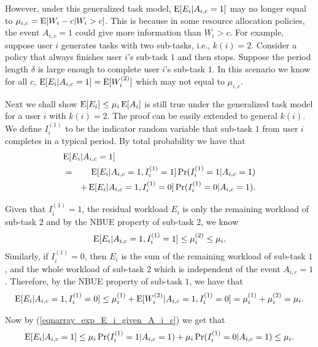 \documentclass[prodmode,acmtompecs]{acmsmall}
\begin{document}
However, under this generalized task model, $\operatorname*{\mathrm{E}}[E_i|A_{i,c} = 1]$ may no longer equal to $\mu_{i,c} = \operatorname*{\mathrm{E}}[W_i - c|W_i > c]$. This is because in some resource allocation policies, the event $A_{i, c} = 1$ could give more information than $W_i > c$. For example, suppose user $i$ generates tasks with two sub-tasks, i.e., $k(i) = 2$. Consider a policy that always finishes user $i$'s sub-task $1$ and then stops. Suppose the period length $\delta$ is large enough to complete user $i$'s sub-task $1$. In this scenario we know for all $c$, $\operatorname*{\mathrm{E}}[E_i | A_{i, c} = 1] = \operatorname*{\mathrm{E}}[W_i^{(2)}]$ which may not equal to $\mu_{i,c}$. 

Next we shall show $\operatorname*{\mathrm{E}}[E_i] \leq \mu_i \operatorname*{\mathrm{E}}[A_i]$ is still true under the generalized task model for a user $i$ with $k(i)=2$. The proof can be easily extended to general $k(i)$. We define $I_i^{(1)}$ to be the indicator random variable that sub-task $1$ from user $i$ completes in a typical period. By total probability we have that
\begin{eqnarray}
\label{eqnarray_exp_E_i_given_A_i_c}
\lefteqn{\expectation[E_i | A_{i, c} = 1]}	\\
& = & \expectation[E_i | A_{i, c} = 1, I_i^{(1)} = 1] \Pr(I_i^{(1)} = 1 | A_{i,c} = 1)	 \notag \\
&  & + \expectation[E_i | A_{i, c} = 1, I_i^{(1)} = 0] \Pr(I_i^{(1)} = 0 | A_{i,c} = 1).	\notag 
\end{eqnarray}

Given that $I_i^{(1)} = 1$, the residual workload $E_i$ is only the remaining workload of sub-task $2$ and by the NBUE property of sub-task $2$, we know
$$
\operatorname*{\mathrm{E}}[E_i | A_{i, c} = 1, I_i^{(1)} = 1] \leq \mu_i^{(2)} \leq \mu_i. 
$$
Similarly, if $I_i^{(1)} = 0$, then $E_i$ is the sum of the remaining workload of sub-task $1$, and the whole workload of sub-task $2$ which is independent of the event $A_{i, c} = 1$. Therefore, by the NBUE property of sub-task $1$, we have that
\begin{align*}
\operatorname*{\mathrm{E}}[E_i | A_{i, c} = 1, I_i^{(1)} = 0] \leq \mu_i^{(1)} + \operatorname*{\mathrm{E}}[W_i^{(2)} | A_{i,c} = 1, I_i^{(1)} = 0] = \mu_i^{(1)} + \mu_i^{(2)} = \mu_i. 
\end{align*}

Now by (\ref{eqnarray_exp_E_i_given_A_i_c}) we get that
\begin{align*}
\operatorname*{\mathrm{E}}[E_i | A_{i, c} = 1] \leq \mu_i\Pr(I_i^{(1)} = 1 | A_{i,c} = 1)  + \mu_i \Pr(I_i^{(1)} = 0 | A_{i,c} = 1) \leq \mu_i. 
\end{align*}
\end{document}
